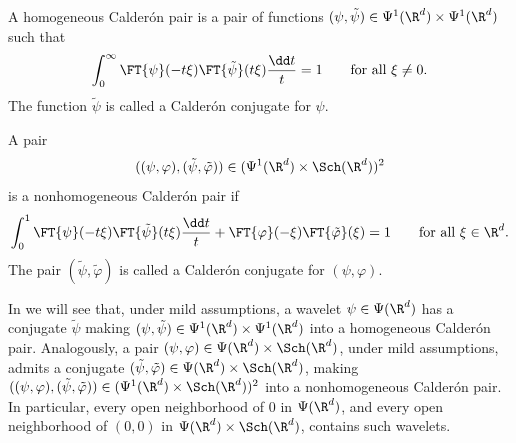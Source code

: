 \begin{definition}\label{defn:Calderon-pair} A homogeneous Calder\'on pair is a pair of functions \((\psi,\tilde{\psi})\in\Psi^{1}(\R^{d})\times \Psi^{1}(\R^{d})\) such that
\[
\int_{0}^{\infty}
\FT{\psi}(-t\xi)\FT{\tilde{\psi}} (t\xi)
\frac{\dd t}{t}
=
1
\qquad \text{for all } \xi\neq 0.
\]
The function \(\tilde{\psi}\) is called a Calder\'on conjugate for \(\psi\).

A pair
\[
((\psi,\varphi),(\tilde{\psi},\tilde{\varphi}))
\in
(\Psi^{1}(\R^{d})\times\Sch(\R^{d}))^{2}
\]
is a nonhomogeneous Calder\'on pair if
\[
\int_{0}^{1}
\FT{\psi}(-t\xi)\FT{\tilde{\psi}} (t\xi)
\frac{\dd t}{t}
+
\FT{\varphi}(-\xi)\FT{\tilde{\varphi}}(\xi)
=
1
\qquad \text{for all } \xi\in \R^d.
\]
The pair \((\tilde{\psi},\tilde{\varphi})\) is called a Calder\'on conjugate for \((\psi,\varphi)\).
\end{definition}

In  we will see that, under mild assumptions, a wavelet \(\psi\in\Psi(\R^{d})\) has a conjugate \(\tilde{\psi}\) making \((\psi,\tilde{\psi})\in\Psi^{1}(\R^{d})\times \Psi^{1}(\R^{d})\) into a homogeneous Calder\'on pair.
Analogously, a pair \((\psi,\varphi)\in\Psi(\R^{d})\times\Sch(\R^{d})\), under mild assumptions, admits a conjugate \((\tilde{\psi},\tilde{\varphi})\in\Psi(\R^{d})\times\Sch(\R^{d})\), making \(((\psi,\varphi),(\tilde{\psi},\tilde{\varphi}))\in (\Psi^{1}(\R^{d})\times\Sch(\R^{d}))^{2}\) into a nonhomogeneous Calder\'on pair.
In particular, every open neighborhood of \(0\) in \(\Psi(\R^d)\), and every open neighborhood of \((0,0)\) in \(\Psi(\R^d)\times\Sch(\R^d)\), contains such wavelets.

